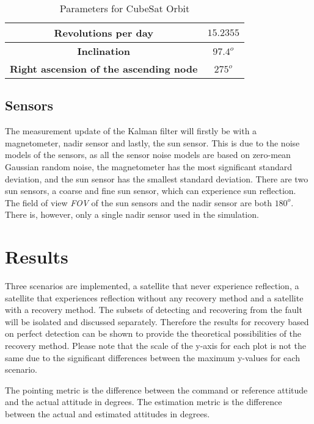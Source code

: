 \documentclass[letterpaper, 10 pt, conference]{ieeeconf}  %
\begin{document}
\begin{table}[!htb]
	\caption{\label{Table:OrbitParameters}Parameters for CubeSat Orbit}
	\begin{tabular}{|c|c|}
		\hline
		\textbf{Revolutions per day}          & $15.2355$                    \\ \hline
		\textbf{Inclination}          & $97.4^o$                    \\ \hline
		\textbf{Right ascension of the ascending node} & $275^o$ \\ \hline
	\end{tabular}
\end{table}

\subsection{Sensors}
The measurement update of the Kalman filter will firstly be with a magnetometer, nadir sensor and lastly, the sun sensor. This is due to the noise models of the sensors, as all the sensor noise models are based on zero-mean Gaussian random noise, the magnetometer has the most significant standard deviation, and the sun sensor has the smallest standard deviation. There are two sun sensors, a coarse and fine sun sensor, which can experience sun reflection. The field of view \emph{FOV} of the sun sensors and the nadir sensor are both $180^o$. There is, however, only a single nadir sensor used in the simulation.

\section{Results}
\label{section:Results}
Three scenarios are implemented, a satellite that never experience reflection, a satellite that experiences reflection without any recovery method and a satellite with a recovery method. The subsets of detecting and recovering from the fault will be isolated and discussed separately. Therefore the results for recovery based on perfect detection can be shown to provide the theoretical possibilities of the recovery method. Please note that the scale of the y-axis for each plot is not the same due to the significant differences between the maximum y-values for each scenario.

The pointing metric is the difference between the command or reference attitude and the actual attitude in degrees. The estimation metric is the difference between the actual and estimated attitudes in degrees.
\end{document}
